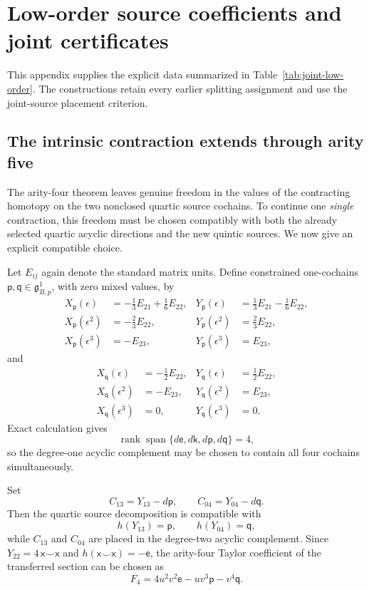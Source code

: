 \documentclass[11pt]{amsart}
\newcommand{\Span}{\operatorname{span}}
\newcommand{\rank}{\operatorname{rank}}
\newcommand{\ghoch}{\mathfrak g}
\begin{document}
\section{Low-order source coefficients and joint certificates}\label{app:low-order-sources}
This appendix supplies the explicit data summarized in
Table~\ref{tab:joint-low-order}. The constructions retain every earlier
splitting assignment and use the joint-source placement criterion.

\subsection{The intrinsic contraction extends through arity five}\label{subsec:intrinsic-quintic}

The arity-four theorem leaves genuine freedom in the values of the contracting homotopy on the two nonclosed quartic source cochains.  To continue one \emph{single} contraction, this freedom must be chosen compatibly with both the already selected quartic acyclic directions and the new quintic sources.  We now give an explicit compatible choice.

Let $E_{ij}$ again denote the standard matrix units.  Define constrained one-cochains $\mathsf p,\mathsf q\in\ghoch^1_{B,p}$, with zero mixed values, by
\begin{align*}
X_{\mathsf p}(\epsilon)
&=-\tfrac13E_{21}+\tfrac16E_{22},
&Y_{\mathsf p}(\epsilon)
&=\tfrac13E_{21}-\tfrac16E_{22},\\
X_{\mathsf p}(\epsilon^2)
&=-\tfrac23E_{22},
&Y_{\mathsf p}(\epsilon^2)
&=\tfrac23E_{22},\\
X_{\mathsf p}(\epsilon^3)
&=-E_{23},
&Y_{\mathsf p}(\epsilon^3)
&=E_{23},
\end{align*}
and
\begin{align*}
X_{\mathsf q}(\epsilon)
&=-\tfrac12E_{22},
&Y_{\mathsf q}(\epsilon)
&=\tfrac12E_{22},\\
X_{\mathsf q}(\epsilon^2)
&=-E_{23},
&Y_{\mathsf q}(\epsilon^2)
&=E_{23},\\
X_{\mathsf q}(\epsilon^3)
&=0,
&Y_{\mathsf q}(\epsilon^3)
&=0.
\end{align*}
Exact calculation gives
\begin{equation}\label{eq:arity5-degree1-rank}
\rank\Span\{d\mathsf e,d\mathsf k,d\mathsf p,d\mathsf q\}=4,
\end{equation}
so the degree-one acyclic complement may be chosen to contain all four cochains simultaneously.

Set
\begin{equation}\label{eq:arity5-quartic-complement}
C_{13}=Y_{13}-d\mathsf p,
\qquad
C_{04}=Y_{04}-d\mathsf q.
\end{equation}
Then the quartic source decomposition is compatible with
\[
h(Y_{13})=\mathsf p,
\qquad
h(Y_{04})=\mathsf q,
\]
while $C_{13}$ and $C_{04}$ are placed in the degree-two acyclic complement.  Since $Y_{22}=4\,\mathsf x\smile\mathsf x$ and $h(\mathsf x\smile\mathsf x)=-\mathsf e$, the arity-four Taylor coefficient of the transferred section can be chosen as
\begin{equation}\label{eq:intrinsic-F4}
F_4
=
4u^2v^2\mathsf e
-uv^3\mathsf p
-v^4\mathsf q.
\end{equation}
\end{document}

